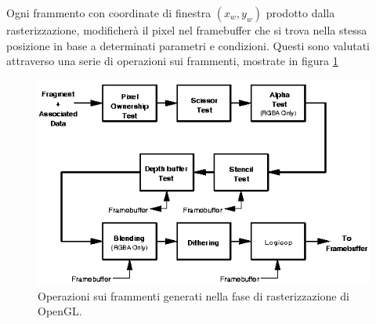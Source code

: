 Ogni frammento con coordinate di finestra $(x_w,y_w)$ prodotto dalla rasterizzazione, modificherà il pixel nel framebuffer che si trova nella stessa posizione in base a determinati parametri e condizioni. Questi sono valutati attraverso una serie di operazioni sui frammenti, mostrate in figura \ref{fig:stato_arte_frag_op}
\\
\begin{figure}[htb]
 \centering
 \includegraphics[width=0.8\linewidth]{images/chapter_stato_arte/stato_arte_frag_op.png}\hfill
 \caption[Operazioni sui frammenti]{Operazioni sui frammenti generati nella fase di rasterizzazione di OpenGL.}
 \label{fig:stato_arte_frag_op}
\end{figure}

